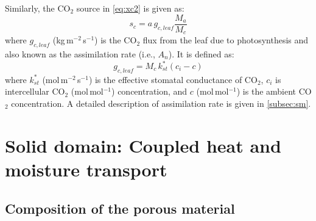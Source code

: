 
Similarly, the CO$_2$ source in \cref{eq:xc2} is given as:
\begin{equation}
s_c = a\,{g_{\mathit{c,leaf}}} \frac{M_a}{M_c}
\end{equation}
where ${g_{\mathit{c,leaf}}}$ (kg\,m$^{-2}$\,s$^{-1}$) is the CO$_2$ flux from the leaf due to photosynthesis and also known as the assimilation rate (i.e., $A_n$). It is defined as:
\begin{equation}
{g_{\mathit{c,leaf}}} = M_c\, k_{st}^* \left( c_i - c \right)
\label{eq:co2flux}
\end{equation}
where $k_{st}^*$ (mol\,m$^{-2}$\,s$^{-1}$) is the effective stomatal conductance of CO$_2$, $c_i$ is intercellular CO$_2$ (mol\,mol$^{-1}$) concentration, and $c$ (mol\,mol$^{-1}$) is the ambient CO$_2$ concentration. A detailed description of assimilation rate is given in \cref{subsec:sm}.

\section{Solid domain: Coupled heat and moisture transport}
\label{sec:soliddomain}
\subsection{Composition of the porous material}

